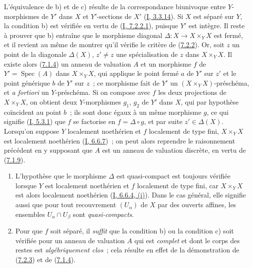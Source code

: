 L'équivalence de b) et de c) résulte de la correspondance biunivoque entre
$Y$-morphismes de $Y'$ dans $X$ et $Y'$-sections de $X'$
(\hyperref[I.3.3.14-fr]{I, 3.3.14}). Si $X$ est séparé sur $Y$, la condition b)
est vérifiée en vertu de (\hyperref[I.7.2.2.1-fr]{I, 7.2.2.1}), puisque $Y'$
est intègre. Il reste à prouver que b) entraîne que le morphisme diagonal
$\Delta:X\to X\times_YX$ est fermé, et il revient au même de montrer qu'il
vérifie le critère de (\hyperref[II.7.2.2-fr]{7.2.2}). Or, soit $z$ un point de
la diagonale $\Delta(X)$, $z'\neq z$ une spécialisation de $z$ dans
$X\times_YX$. Il existe alors (\hyperref[II.7.1.4-fr]{7.1.4}) un anneau de
valuation $A$ et un morphisme $f$ de $Y'=\operatorname{Spec}(A)$ dans
$X\times_YX$, qui applique le point fermé $a$ de $Y'$ sur $z'$ et le point
générique $b$ de $Y'$ sur $z$~; ce morphisme fait de $Y'$ un
$(X\times_YX)$-préschéma, et \emph{a fortiori} un $Y$-préschéma. Si on compose
avec $f$ les deux projections de $X\times_YX$, on obtient deux $Y$-morphismes
$g_1$, $g_2$ de $Y'$ dans $X$, qui par hypothèse coïncident au point $b$~; ils
sont donc égaux à un même morphisme $g$, ce qui signifie
(\hyperref[I.5.3.1-fr]{I, 5.3.1}) que $f$ se factorise en $f=\Delta\circ g$, et
par suite $z'\in\Delta(X)$. Lorsqu'on suppose $Y$ localement noethérien et $f$
localement de type fini, $X\times_YX$ est localement noethérien
(\hyperref[I.6.6.7-fr]{I, 6.6.7})~; on peut alors reprendre le raisonnement
précédent en y supposant que $A$ est un anneau de valuation discrète, en vertu
de (\hyperref[II.7.1.9-fr]{7.1.9}).

\begin{remark}[7.2.4]
\label{II.7.2.4-fr}
\begin{enumerate}
\item[\rm (i)] L'hypothèse que le morphisme $\Delta$ est quasi-compact est
toujours vérifiée lorsque $Y$ est localement noethérien et $f$ localement de
type fini, car $X\times_YX$ est alors localement noethérien
(\hyperref[I.6.6.4-fr]{I, 6.6.4, (i)}). Dans le cas général, elle signifie aussi
que pour tout recouvrement $(U_\alpha)$ de $X$ par des ouverts affines, les
ensembles $U_\alpha\cap U_\beta$ sont \emph{quasi-compacts}.
\item[\rm (ii)] Pour que $f$ soit séparé, il \emph{suffit} que la condition b)
ou la condition c) soit vérifiée pour un anneau de valuation $A$ qui est
\emph{complet} et dont le corps des restes est \emph{algébriquement clos}~;
cela résulte en effet de la démonstration de
(\hyperref[II.7.2.3-fr]{7.2.3}) et de
(\hyperref[II.7.1.4-fr]{7.1.4}).
\end{enumerate}
\end{remark}

